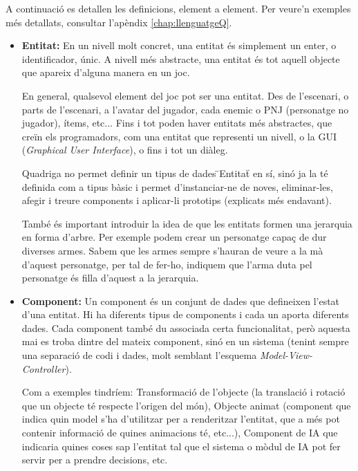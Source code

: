   A continuació es detallen les definicions, element a element. Per veure'n exemples més detallats, consultar l'apèndix \ref{chap:llenguatgeQ}.
  
  \begin{itemize}
    \item{\bf Entitat:}
      En un nivell molt concret, una entitat és simplement un enter, o identificador, únic. A nivell més abstracte, una entitat és tot aquell objecte que apareix d'alguna manera en un joc.
      
      En general, qualsevol element del joc pot ser una entitat. Des de l'escenari, o parts de l'escenari, a l'avatar del jugador, cada enemic o PNJ (personatge no jugador), ítems, etc... Fins i tot poden haver entitats més abstractes, que creïn els programadors, com una entitat que representi un nivell, o la GUI ({\em Graphical User Interface}), o fins i tot un diàleg.

      Quadriga no permet definir un tipus de dades \"{}Entitat\"{} en sí, sinó ja la té definida com a tipus bàsic i permet d'instanciar-ne de noves, eliminar-les, afegir i treure components i aplicar-li prototips (explicats més endavant).
      
      També és important introduir la idea de que les entitats formen una jerarquia en forma d'arbre. Per exemple podem crear un personatge capaç de dur diverses armes. Sabem que les armes sempre s'hauran de veure a la mà d'aquest personatge, per tal de fer-ho, indiquem que l'arma duta pel personatge és filla d'aquest a la jerarquia.
      
      
    \item{\bf Component:}
      Un component és un conjunt de dades que defineixen l'estat d'una entitat. Hi ha diferents tipus de components i cada un aporta diferents dades. Cada component també du associada certa funcionalitat, però aquesta mai es troba dintre del mateix component, sinó en un sistema (tenint sempre una separació de codi i dades, molt semblant l'esquema {\em Model-View-Controller}).
      
      Com a exemples tindríem: Transformació de l'objecte (la translació i rotació que un objecte té respecte l'origen del món), Objecte animat (component que indica quin model s'ha d'utilitzar per a renderitzar l'entitat, que a més pot contenir informació de quines animacions té, etc...), Component de IA que indicaria quines coses sap l'entitat tal que el sistema o mòdul de IA pot fer servir per a prendre decisions, etc.
      

\end{itemize}
